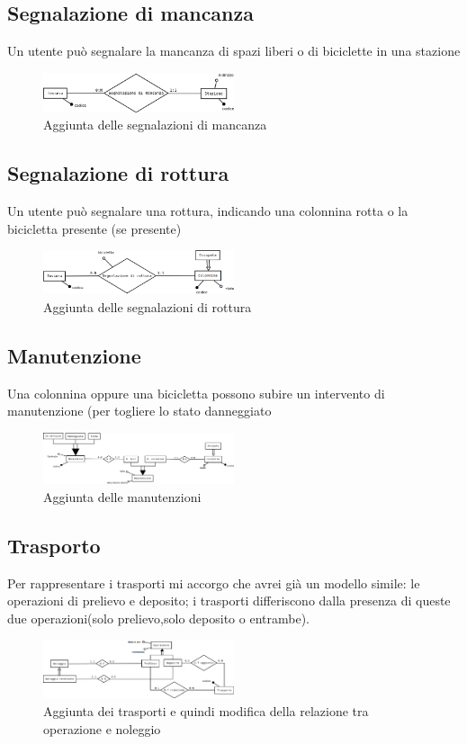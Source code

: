 \documentclass[a4paper,twoside]{article}
\begin{document}
\subsection{Segnalazione di mancanza}
Un utente può segnalare la mancanza di spazi liberi o di biciclette in una stazione
\begin{figure}[H]
 \centering
  \includegraphics[width=0.5\textwidth]{Immagini-Grafici/Concettuale10.png}
\caption{Aggiunta delle segnalazioni di mancanza}
\end{figure}

\subsection{Segnalazione di rottura}
Un utente può segnalare una rottura, indicando una colonnina rotta o la bicicletta presente (se presente)
\begin{figure}[H]
 \centering
  \includegraphics[width=0.5\textwidth]{Immagini-Grafici/Concettuale11.png}
\caption{Aggiunta delle segnalazioni di rottura}
\end{figure}

\subsection{Manutenzione}
Una colonnina oppure una bicicletta possono subire un intervento di manutenzione (per togliere lo stato danneggiato
\begin{figure}[H]
 \centering
  \includegraphics[width=0.5\textwidth]{Immagini-Grafici/Concettuale12.png}
\caption{Aggiunta delle manutenzioni}
\end{figure}

\subsection{Trasporto}
Per rappresentare i trasporti mi accorgo che avrei già un modello simile: le operazioni di prelievo e deposito; i trasporti differiscono dalla presenza di queste due operazioni(solo prelievo,solo deposito o entrambe).
\begin{figure}[H]
 \centering
  \includegraphics[width=0.5\textwidth]{Immagini-Grafici/Concettuale13.png}
\caption{Aggiunta dei trasporti e quindi modifica della relazione tra operazione e noleggio}
\end{figure}
\end{document}
